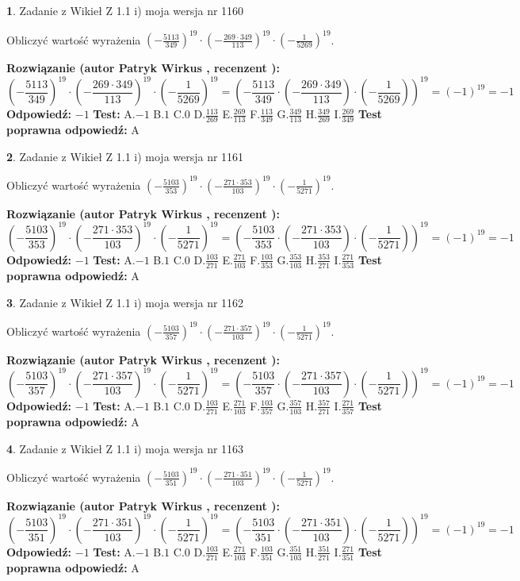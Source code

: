 \documentclass[12pt, a4paper]{article}
\theoremstyle{definition} %
\newtheorem{zad}{}
\newcommand{\zadStart}[1]{\begin{zad}#1\newline}
\newcommand{\zadStop}{\end{zad}}
\newcommand{\rozwStart}[2]{\noindent \textbf{Rozwiązanie (autor #1 , recenzent #2): }\newline}
\newcommand{\rozwStop}{\newline}
\newcommand{\odpStart}{\noindent \textbf{Odpowiedź:}\newline}
\newcommand{\odpStop}{\newline}
\newcommand{\testStart}{\noindent \textbf{Test:}\newline}
\newcommand{\testStop}{\newline}
\newcommand{\kluczStart}{\noindent \textbf{Test poprawna odpowiedź:}\newline}
\newcommand{\kluczStop}{\newline}
\begin{document}
\zadStart{Zadanie z Wikieł Z 1.1 i) moja wersja nr 1160}

Obliczyć wartość wyrażenia $(-\frac{5113}{349})^{19} \cdot (-\frac{269 \cdot 349}{113})^{19} \cdot (-\frac{1}{5269})^{19}$.
\zadStop
\rozwStart{Patryk Wirkus}{}
$$(-\frac{5113}{349})^{19} \cdot (-\frac{269 \cdot 349}{113})^{19} \cdot (-\frac{1}{5269})^{19} = (-\frac{5113}{349} \cdot (-\frac{269 \cdot 349}{113}) \cdot (-\frac{1}{5269}))^{19} = (-1)^{19} = -1$$
\rozwStop
\odpStart
$-1$
\odpStop
\testStart
A.$-1$ B.$1$ C.$0$ D.$\frac{113}{269}$ E.$\frac{269}{113}$
F.$\frac{113}{349}$ G.$\frac{349}{113}$
H.$\frac{349}{269}$
I.$\frac{269}{349}$
\testStop
\kluczStart
A
\kluczStop



\zadStart{Zadanie z Wikieł Z 1.1 i) moja wersja nr 1161}

Obliczyć wartość wyrażenia $(-\frac{5103}{353})^{19} \cdot (-\frac{271 \cdot 353}{103})^{19} \cdot (-\frac{1}{5271})^{19}$.
\zadStop
\rozwStart{Patryk Wirkus}{}
$$(-\frac{5103}{353})^{19} \cdot (-\frac{271 \cdot 353}{103})^{19} \cdot (-\frac{1}{5271})^{19} = (-\frac{5103}{353} \cdot (-\frac{271 \cdot 353}{103}) \cdot (-\frac{1}{5271}))^{19} = (-1)^{19} = -1$$
\rozwStop
\odpStart
$-1$
\odpStop
\testStart
A.$-1$ B.$1$ C.$0$ D.$\frac{103}{271}$ E.$\frac{271}{103}$
F.$\frac{103}{353}$ G.$\frac{353}{103}$
H.$\frac{353}{271}$
I.$\frac{271}{353}$
\testStop
\kluczStart
A
\kluczStop



\zadStart{Zadanie z Wikieł Z 1.1 i) moja wersja nr 1162}

Obliczyć wartość wyrażenia $(-\frac{5103}{357})^{19} \cdot (-\frac{271 \cdot 357}{103})^{19} \cdot (-\frac{1}{5271})^{19}$.
\zadStop
\rozwStart{Patryk Wirkus}{}
$$(-\frac{5103}{357})^{19} \cdot (-\frac{271 \cdot 357}{103})^{19} \cdot (-\frac{1}{5271})^{19} = (-\frac{5103}{357} \cdot (-\frac{271 \cdot 357}{103}) \cdot (-\frac{1}{5271}))^{19} = (-1)^{19} = -1$$
\rozwStop
\odpStart
$-1$
\odpStop
\testStart
A.$-1$ B.$1$ C.$0$ D.$\frac{103}{271}$ E.$\frac{271}{103}$
F.$\frac{103}{357}$ G.$\frac{357}{103}$
H.$\frac{357}{271}$
I.$\frac{271}{357}$
\testStop
\kluczStart
A
\kluczStop



\zadStart{Zadanie z Wikieł Z 1.1 i) moja wersja nr 1163}

Obliczyć wartość wyrażenia $(-\frac{5103}{351})^{19} \cdot (-\frac{271 \cdot 351}{103})^{19} \cdot (-\frac{1}{5271})^{19}$.
\zadStop
\rozwStart{Patryk Wirkus}{}
$$(-\frac{5103}{351})^{19} \cdot (-\frac{271 \cdot 351}{103})^{19} \cdot (-\frac{1}{5271})^{19} = (-\frac{5103}{351} \cdot (-\frac{271 \cdot 351}{103}) \cdot (-\frac{1}{5271}))^{19} = (-1)^{19} = -1$$
\rozwStop
\odpStart
$-1$
\odpStop
\testStart
A.$-1$ B.$1$ C.$0$ D.$\frac{103}{271}$ E.$\frac{271}{103}$
F.$\frac{103}{351}$ G.$\frac{351}{103}$
H.$\frac{351}{271}$
I.$\frac{271}{351}$
\testStop
\kluczStart
A
\kluczStop
\end{document}
